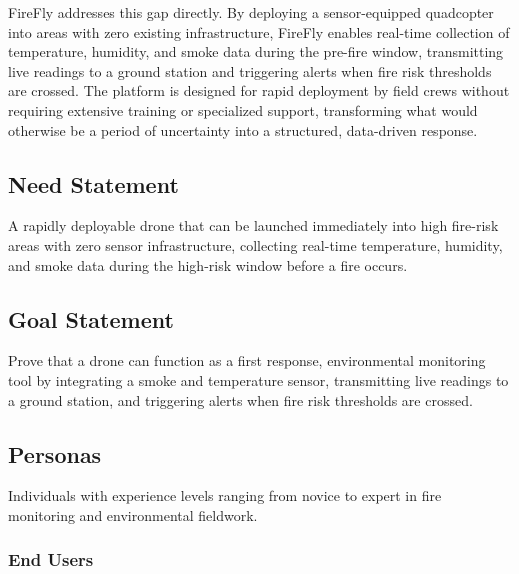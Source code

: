 \documentclass[journal, onecolumn]{IEEEtran}
\begin{document}
\vspace{1em}


FireFly addresses this gap directly. By deploying a sensor-equipped quadcopter into areas with zero existing infrastructure, FireFly enables real-time collection of temperature, humidity, and smoke data during the pre-fire window, transmitting live readings to a ground station and triggering alerts when fire risk thresholds are crossed. The platform is designed for rapid deployment by field crews without requiring extensive training or specialized support, transforming what would otherwise be a period of uncertainty into a structured, data-driven response.

\subsection{Need Statement}
A rapidly deployable drone that can be launched immediately into high fire-risk areas with zero sensor infrastructure, collecting real-time temperature, humidity, and smoke data during the high-risk window before a fire occurs.

\subsection{Goal Statement}
Prove that a drone can function as a first response, environmental monitoring tool by integrating a smoke and temperature sensor, transmitting live readings to a ground station, and triggering alerts when fire risk thresholds are crossed.

\subsection{Personas}
Individuals with experience levels ranging from novice to expert in fire monitoring and environmental fieldwork.

\subsubsection*{End Users}
\end{document}
